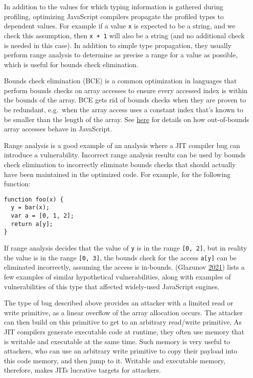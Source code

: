 \documentclass[a4paper,]{report}
\begin{document}
In addition to the values for which typing information is gathered
during profiling, optimizing JavaScript compilers propagate the profiled
types to dependent values. For example if a value \texttt{x} is expected
to be a string, and we check this assumption, then \texttt{x\ +\ 1} will
also be a string (and no additional check is needed in this case). In
addition to simple type propagation, they usually perform range
analysis to determine as precise a range for a
value as possible, which is useful for bounds check
elimination.

Bounds check elimination (BCE) is a
common optimization in languages that perform bounds checks on array
accesses to ensure every accessed index is within the bounds of the
array. BCE gets rid of bounds checks when they are proven to be
redundant, e.g.~when the array access uses a constant index that's known
to be smaller than the length of the array. See
\href{https://developer.mozilla.org/en-US/docs/Web/JavaScript/Reference/Global_Objects/Array/length}{here}
for details on how out-of-bounds array accesses behave in JavaScript.

Range analysis is a good example of an analysis where a JIT compiler bug
can introduce a vulnerability. Incorrect range analysis results can be
used by bounds check elimination to incorrectly eliminate bounds checks
that should actually have been maintained in the optimized code. For
example, for the following function:

\begin{verbatim}
function foo(x) {
  y = bar(x);
  var a = [0, 1, 2];
  return a[y];
}
\end{verbatim}

If range analysis decides that the value of \texttt{y} is in the range
\texttt{{[}0,\ 2{]}}, but in reality the value is in the range
\texttt{{[}0,\ 3{]}}, the bounds check for the access \texttt{a{[}y{]}}
can be eliminated incorrectly, assuming the access is in-bounds.
(Glazunov \protect\hyperlink{ref-Glazunov2021}{2021}) lists a few
examples of similar hypothetical vulnerabilities, along with examples of
vulnerabilities of this type that affected widely-used JavaScript
engines.

The type of bug described above provides an attacker with a limited read
or write primitive, as a linear overflow of the array allocation occurs.
The attacker can then build on this primitive to get to an arbitrary
read/write primitive. As JIT compilers generate executable code at
runtime, they often use memory that is writable and executable at the
same time. Such memory is very useful to attackers, who can use an
arbitrary write primitive to copy their payload into this code memory,
and then jump to it. Writable and executable memory, therefore, makes
JITs lucrative targets for attackers.
\end{document}

